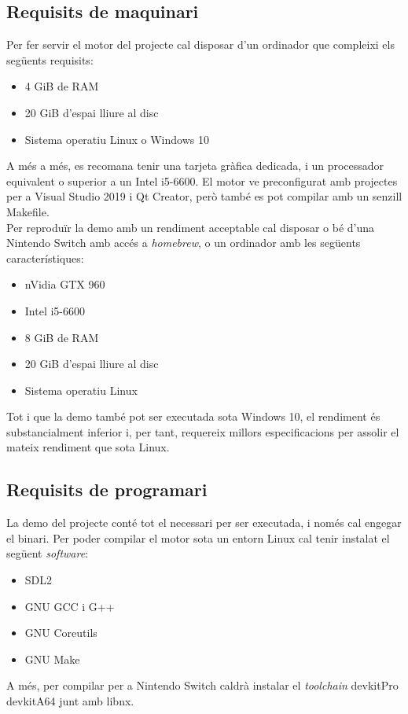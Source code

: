 \subsection{Requisits de maquinari}
Per fer servir el motor del projecte cal disposar d'un ordinador que compleixi els següents requisits:
\begin{itemize}
  \item 4 GiB de RAM
  \item 20 GiB d'espai lliure al disc
  \item Sistema operatiu Linux o Windows 10
\end{itemize}
A més a més, es recomana tenir una tarjeta gràfica dedicada, i un processador equivalent o superior a un Intel i5-6600. El motor ve preconfigurat amb projectes per a Visual Studio 2019 i Qt Creator, però també es pot compilar amb un senzill Makefile.
\\
Per reproduïr la demo amb un rendiment acceptable cal disposar o bé d'una Nintendo Switch amb accés a \textit{homebrew}, o un ordinador amb les següents característiques:
\begin{itemize}
  \item nVidia GTX 960
  \item Intel i5-6600
  \item 8 GiB de RAM
  \item 20 GiB d'espai lliure al disc
  \item Sistema operatiu Linux
\end{itemize}
Tot i que la demo també pot ser executada sota Windows 10, el rendiment és substancialment inferior i, per tant, requereix millors especificacions per assolir el mateix rendiment que sota Linux.
\subsection{Requisits de programari}
La demo del projecte conté tot el necessari per ser executada, i només cal engegar el binari.
Per poder compilar el motor sota un entorn Linux cal tenir instalat el següent \textit{software}:
\begin{itemize}
  \item SDL2
  \item GNU GCC i G++
  \item GNU Coreutils
  \item GNU Make
\end{itemize}
A més, per compilar per a Nintendo Switch caldrà instalar el \textit{toolchain} devkitPro devkitA64 junt amb libnx.

